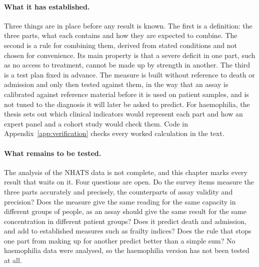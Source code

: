 \paragraph{What it has established.} Three things are in place before any
result is known. The first is a definition: the three parts, what each contains
and how they are expected to combine. The second is a rule for combining them,
derived from stated conditions and not chosen for convenience. Its main property
is that a severe deficit in one part, such as no access to treatment, cannot be
made up by strength in another. The third is a test plan fixed in advance. The
measure is built without reference to death or admission and only then tested
against them, in the way that an assay is calibrated against reference material
before it is used on patient samples, and is not tuned to the diagnosis it will
later be asked to predict. For haemophilia, the thesis sets out which clinical
indicators would represent each part and how an expert panel and a cohort study
would check them. Code in Appendix~\ref{app:verification} checks every worked
calculation in the text.

\paragraph{What remains to be tested.} The analysis of the NHATS data is not
complete, and this chapter marks every result that waits on it. Four questions
are open. Do the survey items measure the three parts accurately and precisely,
the counterparts of assay validity and precision? Does the measure give the same
reading for the same capacity in different groups of people, as an assay should
give the same result for the same concentration in different patient groups?
Does it predict death and admission, and add to established measures such as
frailty indices? Does the rule that stops one part from making up for another
predict better than a simple sum? No haemophilia data were analysed, so the
haemophilia version has not been tested at all.

